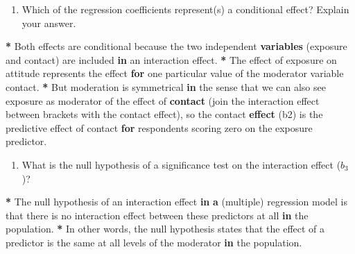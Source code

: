 \documentclass[a4paper]{book}
\newenvironment{Shaded}{\begin{snugshade}}{\end{snugshade}}
\newcommand{\KeywordTok}[1]{\textcolor[rgb]{0,0,0}{\textbf{#1}}}
\newcommand{\StringTok}[1]{\textcolor[rgb]{0.00,0.00,0.00}{#1}}
\newcommand{\ControlFlowTok}[1]{\textcolor[rgb]{0.00,0.00,0.00}{\textbf{#1}}}
\newcommand{\OperatorTok}[1]{\textcolor[rgb]{0.00,0.00,0.00}{\textbf{#1}}}
\newcommand{\NormalTok}[1]{#1}
\providecommand{\tightlist}{%
  \setlength{\itemsep}{0pt}\setlength{\parskip}{0pt}}
\theoremstyle{definition}
\theoremstyle{definition}
\theoremstyle{definition}
\theoremstyle{remark}
\begin{document}
\begin{enumerate}
\def\labelenumi{\arabic{enumi}.}
\setcounter{enumi}{3}
\tightlist
\item
  Which of the regression coefficients represent(s) a conditional
  effect? Explain your answer.
\end{enumerate}

\begin{Shaded}
\begin{Highlighting}[]
\OperatorTok{*}\StringTok{ }\NormalTok{Both effects are conditional because the two independent }\KeywordTok{variables}\NormalTok{ (exposure}
\NormalTok{and contact) are included }\ControlFlowTok{in}\NormalTok{ an interaction effect.}
\OperatorTok{*}\StringTok{ }\NormalTok{The effect of exposure on attitude represents the effect }\ControlFlowTok{for}\NormalTok{ one particular}
\NormalTok{value of the moderator variable contact.}
\OperatorTok{*}\StringTok{ }\NormalTok{But moderation is symmetrical }\ControlFlowTok{in}\NormalTok{ the sense that we can also see exposure as}
\NormalTok{moderator of the effect of }\KeywordTok{contact}\NormalTok{ (join the interaction effect between}
\NormalTok{brackets with the contact effect), so the contact }\KeywordTok{effect}\NormalTok{ (b2) is the}
\NormalTok{predictive effect of contact }\ControlFlowTok{for}\NormalTok{ respondents scoring zero on the exposure}
\NormalTok{predictor.}
\end{Highlighting}
\end{Shaded}

\begin{enumerate}
\def\labelenumi{\arabic{enumi}.}
\setcounter{enumi}{4}
\tightlist
\item
  What is the null hypothesis of a significance test on the interaction
  effect (\(b_3\))?
\end{enumerate}

\begin{Shaded}
\begin{Highlighting}[]
\OperatorTok{*}\StringTok{ }\NormalTok{The null hypothesis of an interaction effect }\ControlFlowTok{in} \KeywordTok{a}\NormalTok{ (multiple) regression}
\NormalTok{model is that there is no interaction effect between these predictors at all}
\ControlFlowTok{in}\NormalTok{ the population.}
\OperatorTok{*}\StringTok{ }\NormalTok{In other words, the null hypothesis states that the effect of a predictor is}
\NormalTok{the same at all levels of the moderator }\ControlFlowTok{in}\NormalTok{ the population.}
\end{Highlighting}
\end{Shaded}
\end{document}
